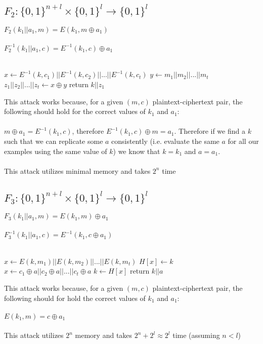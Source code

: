 \documentclass[]{article}
\begin{document}
\subsection{$F_2: \{0,1\}^{n + l}\times \{0,1\}^l \rightarrow \{0,1\}^l$}

$F_2(k_1 || a_1, m) =  E(k_1, m \oplus a_1)$
\\\\
$F_2^{-1}(k_1 || a_1, c) =  E^{-1}(k_1, c) \oplus a_1$
\\\\
\begin{algorithm}[H]
	\SetAlgoLined
	 {
		
		$x \leftarrow E^{-1}(k, c_1) || E^{-1}(k, c_2) || ... || E^{-1}(k, c_t)$\;
		$y \leftarrow m_1 || m_2 || ... || m_t$\;
		$z_1 || z_2 || ... || z_t \leftarrow x \oplus y$\;
		 {
			return $k || z_1$
		} 
	}
	\caption{$Attack((m_1,c_1),(m_2, c_2), ..., (m_t, c_t))$}
\end{algorithm}
This attack works because, for a given $(m, c)$ plaintext-ciphertext pair, the following should hold for the correct values of $k_1$ and $a_1$:
\\\\
$m \oplus a_1 = E^{-1}(k_1, c)$, therefore $E^{-1}(k_1, c) \oplus m = a_1$. Therefore if we find a $k$ such that we can replicate some $a$ consistently (i.e. evaluate the same $a$ for all our examples using the same value of $k$) we know that $k = k_1$ and $a = a_1$.
\\\\ 
This attack utilizes minimal memory and takes $2^n$ time

\subsection{$F_3: \{0,1\}^{n + l}  \times \{0,1\}^l \rightarrow \{0,1\}^l$}

$F_3(k_1 || a_1, m) =  E(k_1, m) \oplus a_1$
\\\\
$F_3^{-1}(k_1 || a_1, c) =  E^{-1}(k_1, c \oplus a_1)$
\\\\
\begin{algorithm}[H]
	\SetAlgoLined
	 {
		$x \leftarrow E(k, m_1) || E(k, m_2) || ... || E(k, m_t)$\;
		$H[x] \leftarrow k$\;
	}
	 {
		$x \leftarrow c_1 \oplus a || c_2 \oplus a  || ... || c_t \oplus a $\;
		 {
			$k \leftarrow H[x]$\;
			return $k || a$\;
		}
	}
	\caption{$Attack((m_1,c_1),(m_2, c_2), ..., (m_t, c_t))$}
\end{algorithm}
This attack works because, for a given $(m, c)$ plaintext-ciphertext pair, the following should for hold the correct values of $k_1$ and $a_1$:
\\\\
$E(k_1, m) = c \oplus a_1$
\\\\
This attack utilizes $2^n$ memory and takes $2^n + 2^l \approx 2^{l}$ time (assuming $n < l$)
\end{document}
